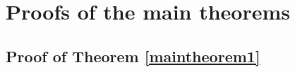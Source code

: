 \section{Proofs of the main theorems} \label{ProofsofMainTheorems}

\subsection{Proof of Theorem \ref{maintheorem1}}
